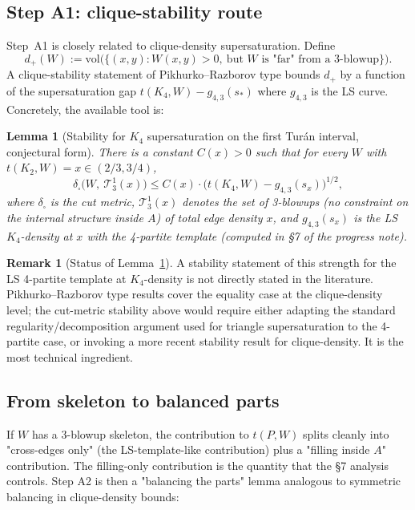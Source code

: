 \documentclass[11pt]{amsart}
\newtheorem{lemma}[theorem]{Lemma}
\theoremstyle{definition}
\newtheorem{remark}[theorem]{Remark}
\begin{document}
\subsection{Step A1: clique-stability route}

Step~A1 is closely related to clique-density supersaturation.  Define
\[
   d_+(W) := \mathrm{vol}\bigl(\{(x,y) : W(x,y)>0,\ \text{but $W$ is "far" from a 3-blowup}\}\bigr).
\]
A clique-stability statement of Pikhurko--Razborov type bounds $d_+$ by a
function of the supersaturation gap $t(K_4,W) - g_{4,3}(s_*)$ where
$g_{4,3}$ is the LS curve.  Concretely, the available tool is:

\begin{lemma}[Stability for $K_4$ supersaturation on the first Turán interval, conjectural form]
\label{lem:K4-stability}
There is a constant $C(x)>0$ such that for every $W$ with $t(K_2,W)=x\in(2/3,3/4)$,
\[
   \delta_\square\bigl(W,\ \mathcal{T}_{3}^{1}(x)\bigr)
   \le C(x)\cdot \bigl(t(K_4,W) - g_{4,3}(s_x)\bigr)^{1/2},
\]
where $\delta_\square$ is the cut metric, $\mathcal{T}_3^1(x)$ denotes the set of
3-blowups (no constraint on the internal structure inside $A$) of total edge
density $x$, and $g_{4,3}(s_x)$ is the LS $K_4$-density at $x$ with the 4-partite
template (computed in §7 of the progress note).
\end{lemma}

\begin{remark}[Status of Lemma~\ref{lem:K4-stability}]
A stability statement of this strength for the LS 4-partite template at
$K_4$-density is not directly stated in the literature.  Pikhurko--Razborov
type results cover the equality case at the
clique-density level; the cut-metric stability above would require either
adapting the standard regularity/decomposition argument used for triangle
supersaturation to the 4-partite case, or invoking a more recent stability
result for clique-density.  It is the most technical ingredient.
\end{remark}

\subsection{From skeleton to balanced parts}

If $W$ has a 3-blowup skeleton, the contribution to $t(P,W)$ splits cleanly
into "cross-edges only" (the LS-template-like contribution) plus a "filling
inside $A$" contribution.  The filling-only contribution is the quantity that
the §7 analysis controls.  Step A2 is then a "balancing the parts" lemma
analogous to symmetric balancing in clique-density bounds:
\end{document}
